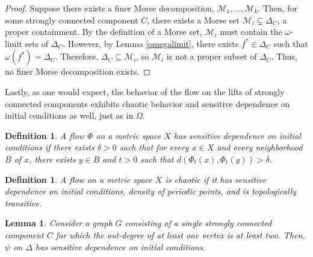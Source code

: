 \documentclass[11pt]{article}
\newtheorem{defn}[thm]{Definition}
\newtheorem{lem}[thm]{Lemma}
\begin{document}
\begin{proof}
Suppose there exists a finer Morse decomposition, $\mathcal{M_1},\ldots,\mathcal{M}_k$.  Then, for some strongly connected component $C$, there exists a Morse set $\mathcal{M}_i \subsetneq \Delta_C$, a proper containment.  By the definition of a Morse set, $\mathcal{M}_i$ must contain the $\omega$-limit sets of $\Delta_C$.  However, by Lemma \ref{omegalimit}, there exists $f^* \in \Delta_C$ such that $\omega(f^*) = \Delta_C$.  Therefore, $\Delta_C \subseteq \mathcal{M}_i$, so $\mathcal{M}_i$ is not a proper subset of $\Delta_C$.  Thus, no finer Morse decomposition exists.

\end{proof}
Lastly, as one would expect, the behavior of the flow on the lifts of strongly connected components exhibits chaotic behavior and sensitive dependence on initial conditions as well, just as in $\Omega$. 


\begin{defn}\label{sensitivedependence}
A flow $\Phi$ on a metric space $X$ has sensitive dependence on initial conditions if there exists $\delta > 0$ such that for every $x \in X$ and every neighborhood $B$ of $x$, there exists $y \in B$ and $t > 0$ such that $d(\Phi_t(x),\Phi_t(y)) > \delta$.
\end{defn}

\begin{defn}\label{chaotic}
A flow on a metric space $X$ is chaotic if it has sensitive dependence on initial conditions, density of periodic points, and is topologically transitive.
\end{defn}

\begin{lem}\label{sensdep}
Consider a graph $G$ consisting of a single strongly connected component $C$ for which the out-degree of at least one vertex is at least two.  Then, $\psi$ on $\Delta$ has sensitive dependence on initial conditions.

\end{lem}
\end{document}
